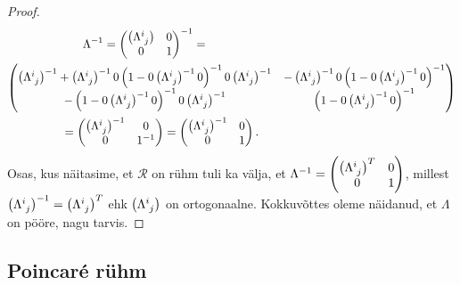 \documentclass[12pt,a4paper,oneside]{article}
\theoremstyle{plain}
\theoremstyle{definition}
\numberwithin{equation}{section}
\begin{document}
\begin{proof}
\begin{multline*}
\Lambda^{-1} = 
\begin{pmatrix}
\left(\Lambda\indices{^i_j}\right) & 0 \\
0 & 1 \\ 
\end{pmatrix}^{-1} = 
\qquad\qquad\qquad\qquad\qquad\qquad\qquad\quad\\
\begin{pmatrix}
\left(\Lambda\indices{^i_j}\right)^{-1} + 
\left(\Lambda\indices{^i_j}\right)^{-1} 0 
\left(1-0 \left(\Lambda\indices{^i_j}\right)
^{-1} 0 \right)^{-1} 0 \left(\Lambda\indices{^i_j}\right)^{-1} & 
-\left(\Lambda\indices{^i_j}\right)^{-1} 0 \left(1 - 0 \left
(\Lambda\indices{^i_j}\right)^{-1} 0 \right)^{-1} \\
-\left(1 - 0 \left(\Lambda\indices{^i_j}\right)^{-1} 0\right)^{-1} 0 
\left(\Lambda\indices{^i_j}\right)^{-1} & \left(1 - 0 \left
(\Lambda\indices{^i_j}\right)^{-1} 0 \right)^{-1} \\
\end{pmatrix} \\
 = \begin{pmatrix}
\left(\Lambda\indices{^i_j}\right)^{-1} & 0 \\
0 & 1^{-1} \\ 
\end{pmatrix} = 
\begin{pmatrix}
\left(\Lambda\indices{^i_j}\right)^{-1} & 0 \\
0 & 1 \\ 
\end{pmatrix}. \qquad\qquad\qquad\qquad\qquad\qquad
\end{multline*}
Osas, kus näitasime, et $\mathcal{R}$ on rühm tuli ka välja, et 
$\Lambda^{-1} = \begin{pmatrix} \left(\Lambda\indices{^i_j}\right)^T 
& 0 \\ 0 & 1 \\ \end{pmatrix}$, millest 
$\left(\Lambda\indices{^i_j}\right)^{-1} = 
\left(\Lambda\indices{^i_j}\right)^T$ ehk 
$\left(\Lambda\indices{^i_j}\right)$ on ortogonaalne. Kokkuvõttes 
oleme näidanud, et $\Lambda$ on pööre, nagu tarvis.
\end{proof}

\subsection{Poincar\'e rühm}
\end{document}
